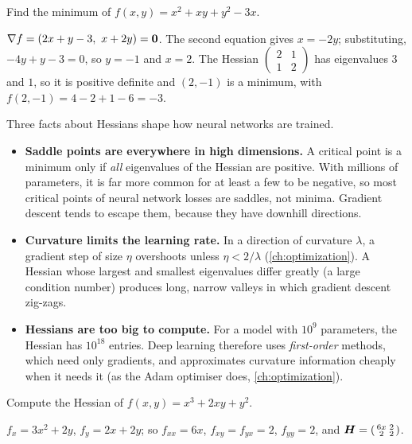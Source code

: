 \begin{example}
Find the minimum of $f(x, y) = x^2 + xy + y^2 - 3x$.

\sol $\nabla f = (2x + y - 3,\ x + 2y) = \bm{0}$. The second equation gives
$x = -2y$; substituting, $-4y + y - 3 = 0$, so $y = -1$ and $x = 2$. The
Hessian $\left(\begin{smallmatrix} 2 & 1\\ 1 & 2\end{smallmatrix}\right)$ has
eigenvalues $3$ and $1$, so it is positive definite and $(2, -1)$ is a minimum,
with $f(2, -1) = 4 - 2 + 1 - 6 = -3$.
\end{example}

\begin{mlnote}
Three facts about Hessians shape how neural networks are trained.
\begin{itemize}
  \item \textbf{Saddle points are everywhere in high dimensions.} A critical
    point is a minimum only if \emph{all} eigenvalues of the Hessian are
    positive. With millions of parameters, it is far more common for at least
    a few to be negative, so most critical points of neural network losses are
    saddles, not minima. Gradient descent tends to escape them, because they
    have downhill directions.
  \item \textbf{Curvature limits the learning rate.} In a direction of
    curvature $\lambda$, a gradient step of size $\eta$ overshoots unless
    $\eta < 2/\lambda$ (\cref{ch:optimization}). A Hessian whose largest and
    smallest eigenvalues differ greatly (a large condition number) produces
    long, narrow valleys in which gradient descent zig-zags.
  \item \textbf{Hessians are too big to compute.} For a model with $10^9$
    parameters, the Hessian has $10^{18}$ entries. Deep learning therefore uses
    \emph{first-order} methods, which need only gradients, and approximates
    curvature information cheaply when it needs it (as the Adam optimiser
    does, \cref{ch:optimization}).
\end{itemize}
\end{mlnote}

\sectionexercises

\begin{exercise}
Compute the Hessian of $f(x, y) = x^3 + 2xy + y^2$.
\end{exercise}
\begin{solution}
$f_x = 3x^2 + 2y$, $f_y = 2x + 2y$; so $f_{xx} = 6x$, $f_{xy} = f_{yx} = 2$,
$f_{yy} = 2$, and $\bm{H} = \left(\begin{smallmatrix} 6x & 2\\ 2 &
2\end{smallmatrix}\right)$.
\end{solution}

